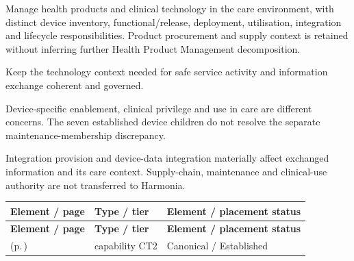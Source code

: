 
Manage health products and clinical technology in the care environment, with distinct device inventory, functional/\allowbreak{}release, deployment, utilisation, integration and lifecycle responsibilities. Product procurement and supply context is retained without inferring further Health Product Management decomposition.



Keep the technology context needed for safe service activity and information exchange coherent and governed.



Device-specific enablement, clinical privilege and use in care are different concerns. The seven established device children do not resolve the separate maintenance-membership discrepancy.



Integration provision and device-data integration materially affect exchanged information and its care context. Supply-chain, maintenance and clinical-use authority are not transferred to Harmonia.


\begingroup\small\setlength{\TableWidth}{\dimexpr\linewidth-6\tabcolsep-4\arrayrulewidth\relax}
\begin{longtable}{|>{\raggedright\arraybackslash}p{0.52\TableWidth}|>{\raggedright\arraybackslash}p{0.2\TableWidth}|>{\raggedright\arraybackslash}p{0.28\TableWidth}|}
\hline\rowcolor{TableHead}\textbf{Element / page} & \textbf{Type / tier} & \textbf{Element / placement status}\\\hline\endfirsthead
\hline\rowcolor{TableHead}\textbf{Element / page} & \textbf{Type / tier} & \textbf{Element / placement status}\\\hline\endhead
\hline\endfoot
\nameref{cap:bc-clinical-technology-management} (p.\,\pageref{cap:bc-clinical-technology-management}) & capability CT2 & Canonical / Established\\\hline
\end{longtable}\endgroup

